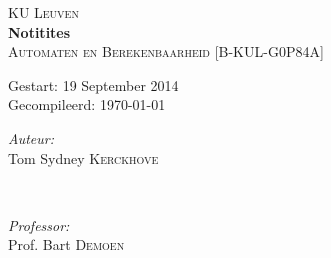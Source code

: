 \begin{titlepage}
\thispagestyle{empty}
\newcommand{\HRule}{\rule{\linewidth}{0.5mm}}
\center
\textsc{\LARGE KU Leuven}\\[1.5cm]
\vfill
{ \Huge \bfseries Notitites}\\[0.4cm]
\textsc{\large Automaten en Berekenbaarheid [B-KUL-G0P84A]}\\[0.5cm]
\vfill
\begin{Large}
Gestart: 19 September 2014\\
Gecompileerd: \today\\
\end{Large}
\vfill
\begin{minipage}{0.4\textwidth}
\begin{flushleft} \large
\emph{Auteur:}\\
Tom Sydney \textsc{Kerckhove}
\end{flushleft}
\end{minipage}
~
\begin{minipage}{0.4\textwidth}
\begin{flushright} \large
\emph{Professor:} \\
Prof. Bart \textsc{Demoen}\\
\end{flushright}
\end{minipage}\\[4cm]
\end{titlepage}